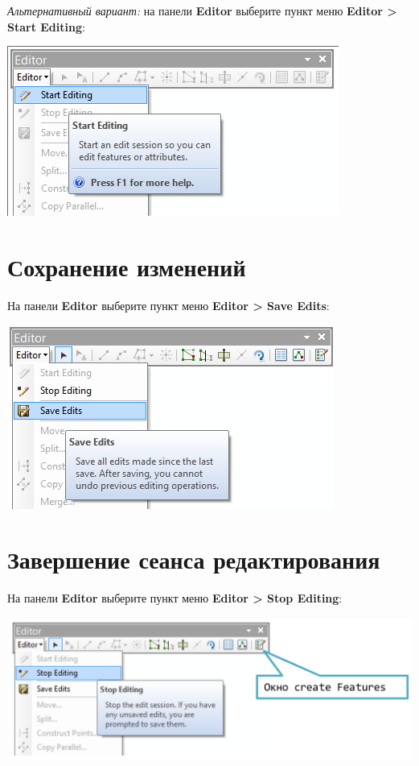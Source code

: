\documentclass[12pt,]{book}
\begin{document}
\emph{Альтернативный вариант:} на панели \textbf{Editor} выберите пункт меню \textbf{Editor \textgreater{} Start Editing}:

\includegraphics{images/Appendix/image88.png}

\hypertarget{manual-edit-save}{%
\section{Сохранение изменений}\label{manual-edit-save}}

На панели \textbf{Editor} выберите пункт меню \textbf{Editor \textgreater{} Save Edits}:

\includegraphics{images/Appendix/image89.png}

\hypertarget{manual-edit-end}{%
\section{Завершение сеанса редактирования}\label{manual-edit-end}}

На панели \textbf{Editor} выберите пункт меню \textbf{Editor \textgreater{} Stop Editing}:

\includegraphics{images/Appendix/image90.png}
\end{document}
